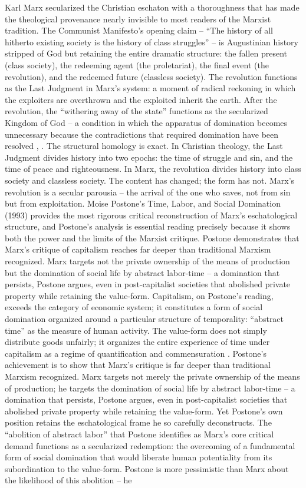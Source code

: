 Karl Marx secularized the Christian eschaton with a thoroughness that has made the theological provenance nearly invisible to most readers of the Marxist tradition. The Communist Manifesto’s opening claim – “The history of all hitherto existing society is the history of class struggles” – is Augustinian history stripped of God but retaining the entire dramatic structure: the fallen present (class society), the redeeming agent (the proletariat), the final event (the revolution), and the redeemed future (classless society). The revolution functions as the Last Judgment in Marx’s system: a moment of radical reckoning in which the exploiters are overthrown and the exploited inherit the earth. After the revolution, the “withering away of the state” functions as the secularized Kingdom of God – a condition in which the apparatus of domination becomes unnecessary because the contradictions that required domination have been resolved \cite[pp.~3-5]{marx_engels_1848}, \cite[pp.~17-20]{marx_1875}. The structural homology is exact. In Christian theology, the Last Judgment divides history into two epochs: the time of struggle and sin, and the time of peace and righteousness. In Marx, the revolution divides history into class society and classless society. The content has changed; the form has not. Marx’s revolution is a secular parousia – the arrival of the one who saves, not from sin but from exploitation. Moise Postone’s Time, Labor, and Social Domination (1993) provides the most rigorous critical reconstruction of Marx’s eschatological structure, and Postone’s analysis is essential reading precisely because it shows both the power and the limits of the Marxist critique. Postone demonstrates that Marx’s critique of capitalism reaches far deeper than traditional Marxism recognized. Marx targets not the private ownership of the means of production but the domination of social life by abstract labor-time – a domination that persists, Postone argues, even in post-capitalist societies that abolished private property while retaining the value-form. Capitalism, on Postone’s reading, exceeds the category of economic system; it constitutes a form of social domination organized around a particular structure of temporality: “abstract time” as the measure of human activity. The value-form does not simply distribute goods unfairly; it organizes the entire experience of time under capitalism as a regime of quantification and commensuration \cite[pp.~5-30, 185-225]{postone_1993}. Postone’s achievement is to show that Marx’s critique is far deeper than traditional Marxism recognized. Marx targets not merely the private ownership of the means of production; he targets the domination of social life by abstract labor-time – a domination that persists, Postone argues, even in post-capitalist societies that abolished private property while retaining the value-form. Yet Postone’s own position retains the eschatological frame he so carefully deconstructs. The “abolition of abstract labor” that Postone identifies as Marx’s core critical demand functions as a secularized redemption: the overcoming of a fundamental form of social domination that would liberate human potentiality from its subordination to the value-form. Postone is more pessimistic than Marx about the likelihood of this abolition – he 